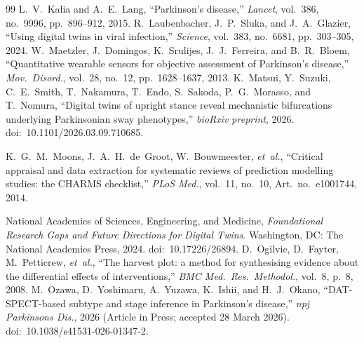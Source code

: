 \begin{thebibliography}{99}
L.~V.~Kalia and A.~E.~Lang, ``Parkinson's disease,'' \textit{Lancet}, vol.~386, no.~9996, pp.~896--912, 2015.
R.~Laubenbacher, J.~P.~Sluka, and J.~A.~Glazier, ``Using digital twins in viral infection,'' \textit{Science}, vol.~383, no.~6681, pp.~303--305, 2024.
W.~Maetzler, J.~Domingos, K.~Srulijes, J.~J.~Ferreira, and B.~R.~Bloem, ``Quantitative wearable sensors for objective assessment of Parkinson's disease,'' \textit{Mov.\ Disord.}, vol.~28, no.~12, pp.~1628--1637, 2013.
K.~Matsui, Y.~Suzuki, C.~E.~Smith, T.~Nakamura, T.~Endo, S.~Sakoda, P.~G.~Morasso, and T.~Nomura, ``Digital twins of upright stance reveal mechanistic bifurcations underlying Parkinsonian sway phenotypes,'' \textit{bioRxiv preprint}, 2026. doi:~10.1101/2026.03.09.710685.

K.~G.~M.~Moons, J.~A.~H.~de~Groot, W.~Bouwmeester, \textit{et~al.}, ``Critical appraisal and data extraction for systematic reviews of prediction modelling studies: the CHARMS checklist,'' \textit{PLoS Med.}, vol.~11, no.~10, Art.\ no.~e1001744, 2014.

National Academies of Sciences, Engineering, and Medicine, \textit{Foundational Research Gaps and Future Directions for Digital Twins}. Washington, DC: The National Academies Press, 2024. doi:~10.17226/26894.
D.~Ogilvie, D.~Fayter, M.~Petticrew, \textit{et~al.}, ``The harvest plot: a method for synthesising evidence about the differential effects of interventions,'' \textit{BMC Med.\ Res.\ Methodol.}, vol.~8, p.~8, 2008.
M.~Ozawa, D.~Yoshimaru, A.~Yuzawa, K.~Ishii, and H.~J.~Okano, ``DAT-SPECT-based subtype and stage inference in Parkinson's disease,'' \textit{npj Parkinsons Dis.}, 2026 (Article in Press; accepted 28 March 2026). doi:~10.1038/s41531-026-01347-2.


\end{thebibliography}

